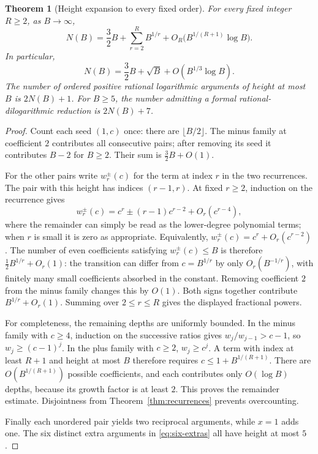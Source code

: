 \documentclass[11pt]{article}
\numberwithin{equation}{section}
\newtheorem{theorem}{Theorem}[section]
\theoremstyle{definition}
\theoremstyle{remark}
\begin{document}
\begin{theorem}[Height expansion to every fixed order]\label{thm:counting}
For every fixed integer $R\ge2$, as $B\to\infty$,
\begin{equation}\label{eq:count-expansion}
 N(B)=\frac32 B+\sum_{r=2}^{R}B^{1/r}
       +O_R\bigl(B^{1/(R+1)}\log B\bigr).
\end{equation}
In particular,
\begin{equation}\label{eq:count-two}
 N(B)=\frac32 B+\sqrt B+O(B^{1/3}\log B).
\end{equation}
The number of ordered positive rational logarithmic arguments of height
at most $B$ is $2N(B)+1$. For $B\ge5$, the number admitting a formal
rational-dilogarithmic reduction is $2N(B)+7$.
\end{theorem}
\begin{proof}
Count each seed $(1,c)$ once: there are $\lfloor B/2\rfloor$.
The minus family at coefficient $2$ contributes all consecutive pairs;
after removing its seed it contributes $B-2$ for $B\ge2$. Their sum
is $\tfrac32B+O(1)$.

For the other pairs write $w_r^{\pm}(c)$ for the term at index $r$ in
the two recurrences. The pair with this height has indices $(r-1,r)$.
At fixed $r\ge2$, induction on the recurrence gives
\[
 w_r^{\pm}(c)=c^r\pm(r-1)c^{r-2}+O_r(c^{r-4}),
\]
where the remainder can simply be read as the lower-degree polynomial
terms; when $r$ is small it is zero as appropriate. Equivalently,
$w_r^{\pm}(c)=c^r+O_r(c^{r-2})$. The number of even coefficients
satisfying $w_r^{\pm}(c)\le B$ is therefore
$\tfrac12 B^{1/r}+O_r(1)$: the transition can differ from
$c=B^{1/r}$ by only $O_r(B^{-1/r})$, with finitely many small
coefficients absorbed in the constant. Removing coefficient $2$ from
the minus family changes this by $O(1)$. Both signs together contribute
$B^{1/r}+O_r(1)$. Summing over $2\le r\le R$ gives the displayed
fractional powers.

For completeness, the remaining depths are uniformly bounded. In the
minus family with $c\ge4$, induction on the successive ratios gives
$w_j/w_{j-1}>c-1$, so $w_j\ge(c-1)^j$. In the plus family with
$c\ge2$, $w_j\ge c^j$. A term with index at least $R+1$ and height
at most $B$ therefore requires
$c\le 1+B^{1/(R+1)}$. There are
$O(B^{1/(R+1)})$ possible coefficients, and each contributes only
$O(\log B)$ depths, because its growth factor is at least $2$.
This proves the remainder estimate. Disjointness from
Theorem~\ref{thm:recurrences} prevents overcounting.

Finally each unordered pair yields two reciprocal arguments, while
$x=1$ adds one. The six distinct extra arguments in
\eqref{eq:six-extras} all have height at most $5$.
\end{proof}
\end{document}
